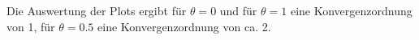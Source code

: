\documentclass[11pt,a4paper,ngerman]{article}
\begin{document}
\begin{description}
\begin{figure}[ht!]
{}
\end{figure}
\end{description}

Die Auswertung der Plots ergibt für $\theta = 0$ und für $\theta = 1$ eine Konvergenzordnung von 1, für $\theta = 0.5$ eine Konvergenzordnung von ca. 2.




\label{LastPage}
\end{document}
